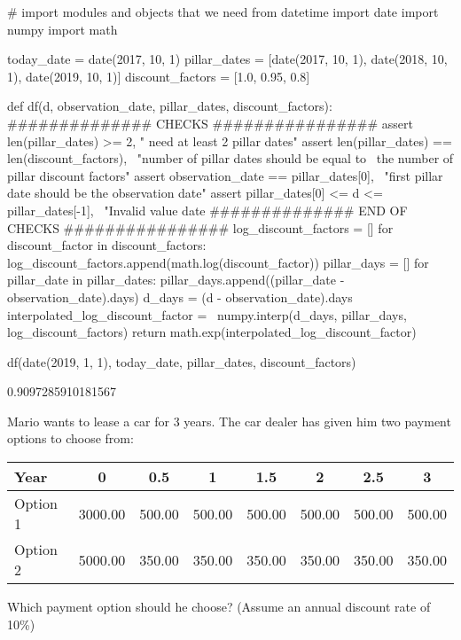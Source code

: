 \cprotEnv\begin{solution}
\begin{ipython}
# import modules and objects that we need
from datetime import date
import numpy
import math

today_date = date(2017, 10, 1)
pillar_dates = [date(2017, 10, 1),
date(2018, 10, 1),
date(2019, 10, 1)]
discount_factors = [1.0, 0.95, 0.8]

def df(d, observation_date, pillar_dates, discount_factors):
    ############## CHECKS ################
    assert len(pillar_dates) >= 2, " need at least 2 pillar dates"
    assert len(pillar_dates) == len(discount_factors), \
        "number of pillar dates should be equal to \
         the number of pillar discount factors"
    assert observation_date == pillar_dates[0], \
        "first pillar date should be the observation date"
    assert pillar_dates[0] <= d <= pillar_dates[-1], \
        "Invalid value date %
    ############## END OF CHECKS ################
    log_discount_factors = []
    for discount_factor in discount_factors:
        log_discount_factors.append(math.log(discount_factor))
    pillar_days = []
    for pillar_date in pillar_dates:
        pillar_days.append((pillar_date - observation_date).days)
    d_days = (d - observation_date).days
    interpolated_log_discount_factor = \
        numpy.interp(d_days, pillar_days, log_discount_factors)
    return math.exp(interpolated_log_discount_factor)

df(date(2019, 1, 1), today_date, pillar_dates, discount_factors)
\end{ipython}
\begin{ioutput}
0.9097285910181567
\end{ioutput}
\end{solution}

\cprotEnv\begin{question}
Mario wants to lease a car for 3 years. The car dealer has given him two payment options to choose from:

\begin{table}[htbp]
\centering
\begin{tabular}{l|c|c|c|c|c|c|c}
Year & 0 & 0.5 & 1 & 1.5 & 2 & 2.5 & 3 \\
\hline
Option 1 &	3000.00	& 500.00 & 500.00 &	500.00 & 500.00 & 500.00 & 500.00 \\
\hline
Option 2 &	5000.00	& 350.00 & 350.00 &	350.00 & 350.00 & 350.00 & 350.00 \\
\end{tabular}
\end{table}

Which payment option should he choose? (Assume an annual discount rate of 10\%)
\end{question}


